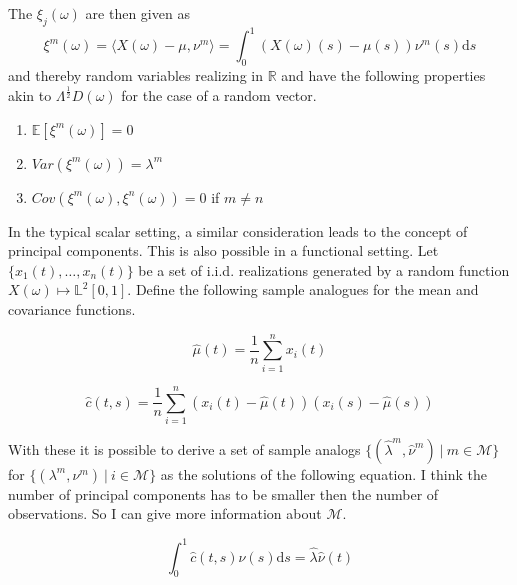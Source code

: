 \documentclass[11pt,twoside,a4paper]{article}
\begin{document}
	The $\xi_j(\omega)$ are then given as 
	\begin{equation}
		\xi^m(\omega) = \langle X(\omega) - \mu, \nu^m\rangle = \int_{0}^{1} \left(X(\omega)(s) - \mu(s)\right) \nu^m(s) \mathrm{d}s
	\end{equation} 
	and thereby random variables realizing in $\mathbb{R}$ and have the following properties akin to $\Lambda^{\frac{1}{2}} D(\omega)$ for the case of a random vector.
	
	\begin{multicols}{2}
		\begin{enumerate}
			\item $\mathbb{E}\left[\xi^m(\omega)\right] = 0$
			\item $Var\left(\xi^m(\omega)\right) = \lambda^m$
			\item $Cov\left(\xi^m(\omega), \xi^n(\omega)\right) = 0$ if $m \neq n$
		\end{enumerate}
	\end{multicols}
	
	In the typical scalar setting, a similar consideration leads to the concept of principal components. This is also possible in a functional setting. Let $\{x_1(t), \dots, x_n(t)\}$ be a set of i.i.d. realizations generated by a random function $X(\omega) \mapsto \mathbb{L}^2[0,1]$.
	Define the following sample analogues for the mean and covariance functions.
	
	\begin{equation}
		\hat{\mu}(t) = \frac{1}{n}\sum_{i = 1}^{n}x_i(t)
	\end{equation}
	
	\begin{equation}
		\hat{c}(t,s) = \frac{1}{n} \sum_{i = 1}^{n} \left(x_i(t) - \hat{\mu}(t)\right) \left(x_i(s) - \hat{\mu}(s)\right)
	\end{equation}
	
	With these it is possible to derive a set of sample analogs $\{(\hat{\lambda}^m, \hat{\nu}^m) \: \vert \: m \in \mathcal{M}\}$ for $\{(\lambda^m, \nu^m) \: \vert \: i \in \mathcal{M}\}$ as the solutions of the following equation. {\color{red} I think the number of principal components has to be smaller then the number of observations. So I can give more information about $\mathcal{M}$.}
	
	\begin{equation}
		\int_{0}^{1}\hat{c}(t,s)\hat{\nu}(s) \mathrm{d}s = \hat{\lambda} \hat{\nu}(t)
	\end{equation}
	
\end{document}
